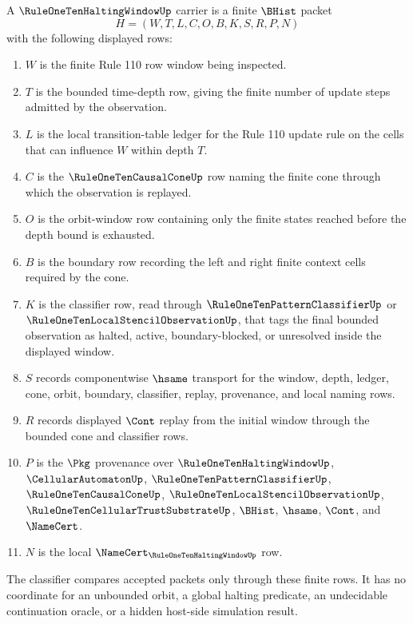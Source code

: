 \begin{definition}
\label{def:rule-one-ten-halting-window-carrier}
A $\RuleOneTenHaltingWindowUp$ carrier is a finite $\BHist$ packet
$$
H=(W,T,L,C,O,B,K,S,R,P,N)
$$
with the following displayed rows:
\begin{enumerate}
\item $W$ is the finite Rule 110 row window being inspected.
\item $T$ is the bounded time-depth row, giving the finite number of update steps admitted by the observation.
\item $L$ is the local transition-table ledger for the Rule 110 update rule on the cells that can influence $W$ within depth $T$.
\item $C$ is the $\RuleOneTenCausalConeUp$ row naming the finite cone through which the observation is replayed.
\item $O$ is the orbit-window row containing only the finite states reached before the depth bound is exhausted.
\item $B$ is the boundary row recording the left and right finite context cells required by the cone.
\item $K$ is the classifier row, read through $\RuleOneTenPatternClassifierUp$ or $\RuleOneTenLocalStencilObservationUp$, that tags the final bounded observation as halted, active, boundary-blocked, or unresolved inside the displayed window.
\item $S$ records componentwise $\hsame$ transport for the window, depth, ledger, cone, orbit, boundary, classifier, replay, provenance, and local naming rows.
\item $R$ records displayed $\Cont$ replay from the initial window through the bounded cone and classifier rows.
\item $P$ is the $\Pkg$ provenance over $\RuleOneTenHaltingWindowUp$, $\CellularAutomatonUp$, $\RuleOneTenPatternClassifierUp$, $\RuleOneTenCausalConeUp$, $\RuleOneTenLocalStencilObservationUp$, $\RuleOneTenCellularTrustSubstrateUp$, $\BHist$, $\hsame$, $\Cont$, and $\NameCert$.
\item $N$ is the local $\NameCert_{\RuleOneTenHaltingWindowUp}$ row.
\end{enumerate}
The classifier compares accepted packets only through these finite rows. It has no coordinate for an unbounded orbit, a global halting predicate, an undecidable continuation oracle, or a hidden host-side simulation result.
\end{definition}

